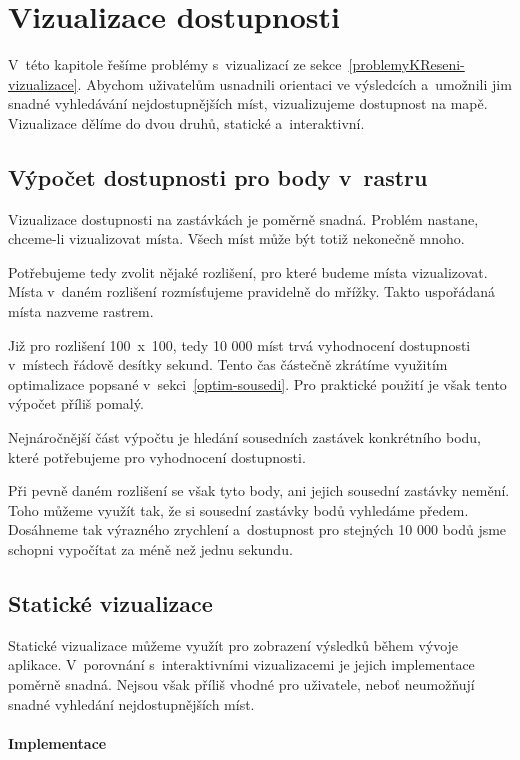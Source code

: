 \chapter{Vizualizace dostupnosti}

V~této kapitole řešíme problémy s~vizualizací ze sekce~\ref{problemyKReseni-vizualizace}. Abychom uživatelům usnadnili orientaci ve výsledcích a~umožnili jim snadné vyhledávání nejdostupnějších míst, vizualizujeme dostupnost na mapě. Vizualizace dělíme do dvou druhů, statické a~interaktivní.

\section{Výpočet dostupnosti pro body v~rastru} \label{optim-body}

Vizualizace dostupnosti na zastávkách je poměrně snadná. Problém nastane, chceme-li vizualizovat místa. Všech míst může být totiž nekonečně mnoho.

Potřebujeme tedy zvolit nějaké rozlišení, pro které budeme místa vizualizovat. Místa v~daném rozlišení rozmísťujeme pravidelně do mřížky. Takto uspořádaná místa nazveme rastrem.

Již pro rozlišení 100~x~100, tedy 10 000 míst trvá vyhodnocení dostupnosti v~místech řádově desítky sekund. Tento čas částečně zkrátíme využitím optimalizace popsané v~sekci~\ref{optim-sousedi}. Pro praktické použití je však tento výpočet příliš pomalý.

Nejnáročnější část výpočtu je hledání sousedních zastávek konkrétního bodu, které potřebujeme pro vyhodnocení dostupnosti. 

Při pevně daném rozlišení se však tyto body, ani jejich sousední zastávky nemění. Toho můžeme využít tak, že si sousední zastávky bodů vyhledáme předem. Dosáhneme tak výrazného zrychlení a~dostupnost pro stejných 10 000 bodů jsme schopni vypočítat za méně než jednu sekundu.

\section{Statické vizualizace}

Statické vizualizace můžeme využít pro zobrazení výsledků během vývoje aplikace. V~porovnání s~interaktivními vizualizacemi je jejich implementace poměrně snadná. Nejsou však příliš vhodné pro uživatele, neboť neumožňují snadné vyhledání nejdostupnějších míst.

\subsubsection{Implementace}

